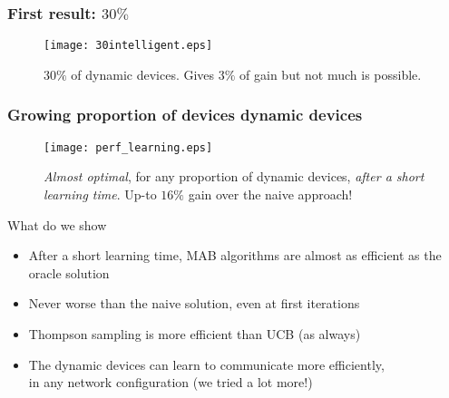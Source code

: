 \subsubsection{First result: $30\%$}

\begin{frameO}

    \begin{figure}[h!]
        \centering
        \texttt{[image: 30intelligent.eps]}

            $30\%$ of dynamic devices. Gives $3\%$ of gain but not much is possible.
    \end{figure}

\end{frameO}


\subsubsection{Growing proportion of devices dynamic devices}

\begin{frameO}[Dependency on \(D/(S+D)\)]

    \begin{figure}[h!]
        \centering
        \texttt{[image: perf\_learning.eps]}

            \emph{Almost optimal}, for any proportion of dynamic devices, \emph{after a short learning time}. Up-to $16\%$ gain over the naive approach!
    \end{figure}

\end{frameO}


\begin{frameO}

    \begin{colorblock}{What do we show}

        \begin{itemize}
            \setlength\itemsep{10pt}
            \item
                  After a short learning time, MAB algorithms are almost as efficient as
                  the oracle solution
            \item
                  Never worse than the naive solution, even at first iterations
            \item
                  Thompson sampling is more efficient than UCB
                  (as always)
            \item
                  The dynamic devices can learn to communicate more efficiently,\\
                  in any network configuration (we tried a lot more!)
        \end{itemize}

    \end{colorblock}

\end{frameO}



